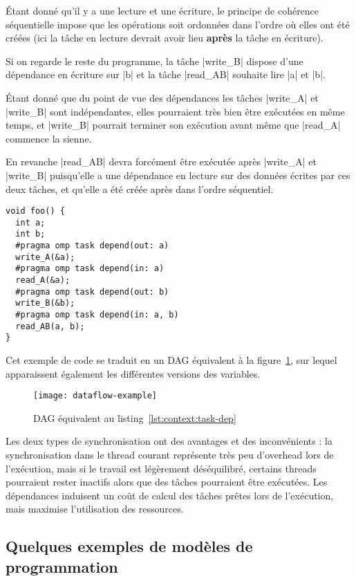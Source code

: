 Étant donné qu'il y a une lecture et une écriture, le principe de cohérence séquentielle impose que les opérations soit ordonnées dans l'ordre où elles ont été créées (ici la tâche en lecture devrait avoir lieu \textbf{après} la tâche en écriture).

Si on regarde le reste du programme, la tâche |write_B| dispose d'une dépendance en écriture sur |b| et la tâche |read_AB| souhaite lire |a| et |b|.

Étant donné que du point de vue des dépendances les tâches |write_A| et |write_B| sont indépendantes, elles pourraient très bien être exécutées en même temps, et |write_B| pourrait terminer son exécution avant même que |read_A| commence la sienne.

En revanche |read_AB| devra forcément être exécutée après |write_A| et |write_B| puisqu'elle a une dépendance en lecture sur des données écrites par ces deux tâches, et qu'elle a été créée après dans l'ordre séquentiel.


\begin{lstlisting}[caption=Synchronisation via des dépendances (OpenMP),label=lst:context:task-dep]
void foo() {
  int a;
  int b;
  #pragma omp task depend(out: a)
  write_A(&a);
  #pragma omp task depend(in: a)
  read_A(&a);
  #pragma omp task depend(out: b)
  write_B(&b);
  #pragma omp task depend(in: a, b)
  read_AB(a, b);
}
\end{lstlisting}

Cet exemple de code se traduit en un DAG équivalent à la figure~\ref{fig:context:dag-dataflow}, sur lequel apparaissent également les différentes versions des variables.

\begin{figure}[ht]
  \centering
  \texttt{[image: dataflow-example]}
  \caption{DAG équivalent au listing~\ref{lst:context:task-dep}}\label{fig:context:dag-dataflow}
\end{figure}

Les deux types de synchronisation ont des avantages et des inconvénients : la synchronisation dans le thread courant représente très peu d'overhead lors de l'exécution, mais si le travail est légèrement déséquilibré, certains threads pourraient rester inactifs alors que des tâches pourraient être exécutées.
Les dépendances induisent un coût de calcul des tâches prêtes lors de l'exécution, mais maximise l'utilisation des ressources.


\subsection{Quelques exemples de modèles de programmation}

